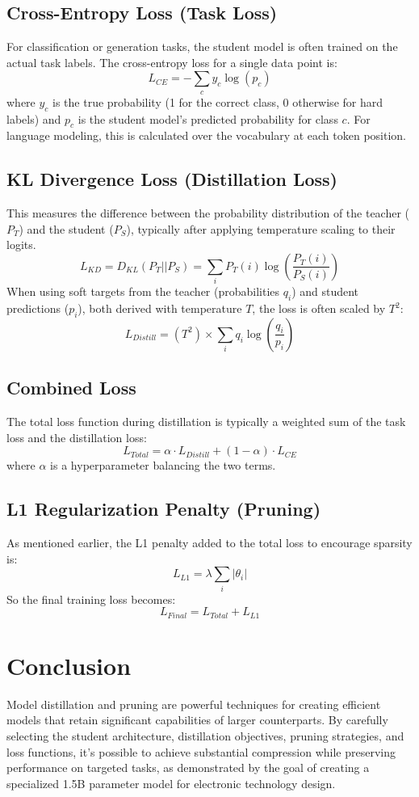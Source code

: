 \documentclass{article}
\begin{document}
\subsection{Cross-Entropy Loss (Task Loss)}
For classification or generation tasks, the student model is often trained on the actual task labels. The cross-entropy loss for a single data point is:
$$ L_{CE} = - \sum_c y_c \log(p_c) $$
where $y_c$ is the true probability (1 for the correct class, 0 otherwise for hard labels) and $p_c$ is the student model's predicted probability for class $c$. For language modeling, this is calculated over the vocabulary at each token position.

\subsection{KL Divergence Loss (Distillation Loss)}
This measures the difference between the probability distribution of the teacher ($P_T$) and the student ($P_S$), typically after applying temperature scaling to their logits.
$$ L_{KD} = D_{KL}(P_T || P_S) = \sum_i P_T(i) \log\left(\frac{P_T(i)}{P_S(i)}\right) $$
When using soft targets from the teacher (probabilities $q_i$) and student predictions ($p_i$), both derived with temperature $T$, the loss is often scaled by $T^2$:
$$ L_{Distill} = (T^2) \times \sum_i q_i \log\left(\frac{q_i}{p_i}\right) $$

\subsection{Combined Loss}
The total loss function during distillation is typically a weighted sum of the task loss and the distillation loss:
$$ L_{Total} = \alpha \cdot L_{Distill} + (1 - \alpha) \cdot L_{CE} $$
where $\alpha$ is a hyperparameter balancing the two terms.

\subsection{L1 Regularization Penalty (Pruning)}
As mentioned earlier, the L1 penalty added to the total loss to encourage sparsity is:
$$ L_{L1} = \lambda \sum_i |\theta_i| $$
So the final training loss becomes:
$$ L_{Final} = L_{Total} + L_{L1} $$

\section{Conclusion}
Model distillation and pruning are powerful techniques for creating efficient models that retain significant capabilities of larger counterparts. By carefully selecting the student architecture, distillation objectives, pruning strategies, and loss functions, it's possible to achieve substantial compression while preserving performance on targeted tasks, as demonstrated by the goal of creating a specialized 1.5B parameter model for electronic technology design.
\end{document}

